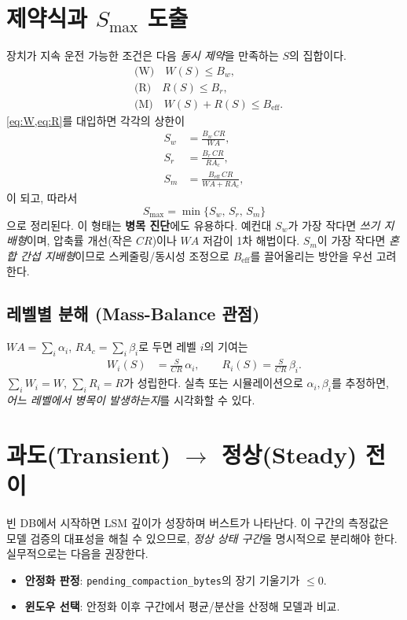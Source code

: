 \documentclass[11pt,a4paper]{article}
\begin{document}
\section{제약식과 \(S_{\max}\) 도출}
장치가 지속 운전 가능한 조건은 다음 \emph{동시 제약}을 만족하는 \(S\)의 집합이다.
\begin{align}
    &\text{(W)}\quad W(S)\le B_w, \label{c:w}\\
    &\text{(R)}\quad R(S)\le B_r, \label{c:r}\\
    &\text{(M)}\quad W(S)+R(S)\le B_{\text{eff}}. \label{c:m}
\end{align}
\cref{eq:W,eq:R}를 대입하면 각각의 상한이
\begin{align}
    S_w &= \frac{B_w\,CR}{WA},\\
    S_r &= \frac{B_r\,CR}{RA_c},\\
    S_m &= \frac{B_{\text{eff}}\,CR}{WA+RA_c},
\end{align}
이 되고, 따라서
\begin{equation}
  \boxed{\,S_{\max}=\min\{S_w,\,S_r,\,S_m\}\,}
  \label{eq:smax}
\end{equation}
으로 정리된다. 이 형태는 \textbf{병목 진단}에도 유용하다.
예컨대 \(S_w\)가 가장 작다면 \emph{쓰기 지배형}이며, 압축률 개선(작은 \(CR\))이나
\(WA\) 저감이 1차 해법이다. \(S_m\)이 가장 작다면 \emph{혼합 간섭 지배형}이므로
스케줄링/동시성 조정으로 \(B_{\text{eff}}\)를 끌어올리는 방안을 우선 고려한다.

\subsection{레벨별 분해 (Mass-Balance 관점)}
\(WA=\sum_i\alpha_i\), \(RA_c=\sum_i\beta_i\)로 두면 레벨 \(i\)의 기여는
\begin{align}
    W_i(S) &= \frac{S}{CR}\,\alpha_i,\qquad
    R_i(S) = \frac{S}{CR}\,\beta_i.
\end{align}
\(\sum_i W_i=W\), \(\sum_i R_i=R\)가 성립한다.
실측 또는 시뮬레이션으로 \(\alpha_i,\beta_i\)를 추정하면,
\emph{어느 레벨에서 병목이 발생하는지}를 시각화할 수 있다.

\section{과도(Transient) \texorpdfstring{$\rightarrow$}{->} 정상(Steady) 전이}
빈 DB에서 시작하면 LSM 깊이가 성장하며 버스트가 나타난다.
이 구간의 측정값은 모델 검증의 대표성을 해칠 수 있으므로,
\emph{정상 상태 구간}을 명시적으로 분리해야 한다.
실무적으로는 다음을 권장한다.
\begin{itemize}
  \item \textbf{안정화 판정}: \texttt{pending\_compaction\_bytes}의 장기 기울기가 \(\le 0\).
  \item \textbf{윈도우 선택}: 안정화 이후 구간에서 평균/분산을 산정해 모델과 비교.
\end{itemize}
\end{document}
